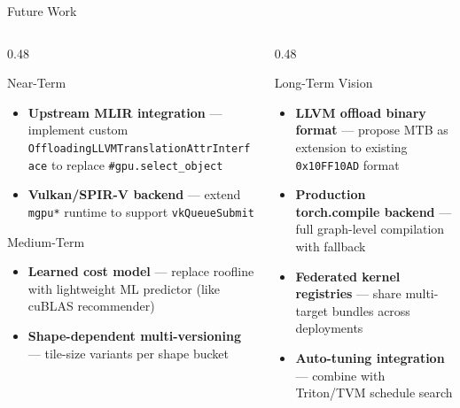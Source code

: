 \documentclass[aspectratio=169,10pt]{beamer}
\begin{document}
\begin{frame}{Future Work}
  \begin{columns}[T]
    \begin{column}{0.48\textwidth}
      \begin{block}{Near-Term}
        \begin{itemize}
          \item \textbf{Upstream MLIR integration} --- implement custom \texttt{OffloadingLLVMTranslation\-AttrInterface} to replace \texttt{\#gpu.select\_object}
          \item \textbf{Vulkan/SPIR-V backend} --- extend \texttt{mgpu*} runtime to support \texttt{vkQueueSubmit}
        \end{itemize}
      \end{block}
      \begin{block}{Medium-Term}
        \begin{itemize}
          \item \textbf{Learned cost model} --- replace roofline with lightweight ML predictor (like cuBLAS recommender)
          \item \textbf{Shape-dependent multi-versioning} --- tile-size variants per shape bucket
        \end{itemize}
      \end{block}
    \end{column}
    \begin{column}{0.48\textwidth}
      \begin{block}{Long-Term Vision}
        \begin{itemize}
          \item \textbf{LLVM offload binary format} --- propose MTB as extension to existing \texttt{0x10FF10AD} format
          \item \textbf{Production torch.compile backend} --- full graph-level compilation with fallback
          \item \textbf{Federated kernel registries} --- share multi-target bundles across deployments
          \item \textbf{Auto-tuning integration} --- combine with Triton/TVM schedule search
        \end{itemize}
      \end{block}
      \vspace{0.5em}
    \end{column}
  \end{columns}
\end{frame}
\end{document}
